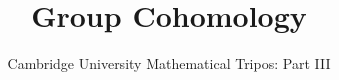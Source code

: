 \documentclass{article}
\title{Group Cohomology}
\author{Cambridge University Mathematical Tripos: Part III}
\begin{document}
\maketitle

\tableofcontentsnewpage{}

% 
\end{document}
